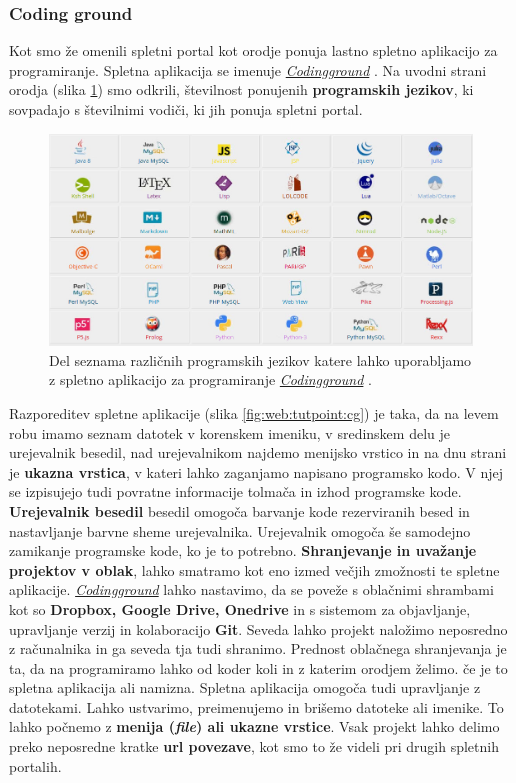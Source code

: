 \subsubsection{Coding ground}
\label{sec:coding_ground}

Kot smo že omenili spletni portal kot orodje ponuja lastno spletno
aplikacijo za programiranje. Spletna aplikacija se imenuje
\emph{\href{http://www.tutorialspoint.com/codingground.htm}{Codingground}}
\cite{web:tutorialspoint:codingground}. Na uvodni strani orodja (slika
\ref{fig:web:tutpoint:cg-pl}) smo odkrili, številnost ponujenih
\textbf{programskih jezikov}, ki sovpadajo s številnimi vodiči, ki jih
ponuja spletni portal.

\begin{figure}[h!]
  \centering
    \includegraphics [width=0.65\linewidth, keepaspectratio =
   1] {./images/sc_web/tutpoint_cg-pl-v01.jpg}
   \caption{Del seznama različnih programskih jezikov katere lahko
     uporabljamo z spletno aplikacijo za programiranje
     \emph{\href{http://www.tutorialspoint.com/codingground.htm}{Codingground}}
     \cite{web:tutorialspoint:codingground}.}
    \label{fig:web:tutpoint:cg-pl}
\end{figure}

Razporeditev spletne aplikacije (slika \ref{fig:web:tutpoint:cg}) je
taka, da na levem robu imamo seznam datotek v korenskem imeniku, v
sredinskem delu je urejevalnik besedil, nad urejevalnikom najdemo
menijsko vrstico in na dnu strani je \textbf{ukazna vrstica}, v kateri
lahko zaganjamo napisano programsko kodo. V njej se izpisujejo tudi
povratne informacije tolmača in izhod programske
kode. \textbf{Urejevalnik besedil} besedil omogoča barvanje kode
rezerviranih besed in nastavljanje barvne sheme
urejevalnika. Urejevalnik omogoča še samodejno zamikanje programske
kode, ko je to potrebno. \textbf{Shranjevanje in uvažanje projektov v
  oblak}, lahko smatramo kot eno izmed večjih zmožnosti te spletne
aplikacije. \emph{\href{http://www.tutorialspoint.com/codingground.htm}{Codingground}}
lahko nastavimo, da se poveže s oblačnimi shrambami kot so
\textbf{Dropbox, Google Drive, Onedrive} in s sistemom za objavljanje,
upravljanje verzij in kolaboracijo \textbf{Git}. Seveda lahko projekt
naložimo neposredno z računalnika in ga seveda tja tudi
shranimo. Prednost oblačnega shranjevanja je ta, da na programiramo
lahko od koder koli in z katerim orodjem želimo. če je to spletna
aplikacija ali namizna. Spletna aplikacija omogoča tudi upravljanje z
datotekami. Lahko ustvarimo, preimenujemo in brišemo datoteke ali
imenike. To lahko počnemo z \textbf{menija (\emph{file}) ali ukazne
  vrstice}. Vsak projekt lahko delimo preko neposredne kratke
\textbf{url povezave}, kot smo to že videli pri drugih spletnih
portalih.

